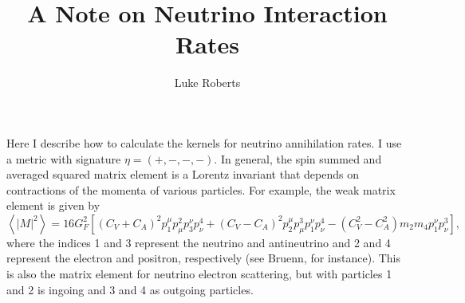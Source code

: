 \documentclass[12pt,letter]{article}
\title{A Note on Neutrino Interaction Rates}
\author{Luke Roberts}
\date{} %
\begin{document}
\maketitle

Here I describe how to calculate the kernels for neutrino annihilation rates.  I use a metric with signature $\eta = (+,-,-,-)$.  In general, the spin summed and averaged squared matrix element is a Lorentz invariant that depends on contractions of the momenta of various particles.  For example, the weak matrix element is given by  
\begin{equation*}
\left\langle \left| M \right|^2 \right \rangle = 16 G_F^2 \left [ 
(C_V + C_A)^2 p^\mu_1 p_\mu^2 p^\nu_3 p_\nu^4
+(C_V - C_A)^2 p^\mu_2 p_\mu^3 p^\nu_1 p_\nu^4
-(C_V^2 - C_A^2) m_2 m_4 p^\nu_1 p_\nu^3
\right],
\end{equation*}
where the indices 1 and 3 represent the neutrino and antineutrino and 2 and 4 represent the electron and positron, respectively (see Bruenn, for instance).  This is also the matrix element for neutrino electron scattering, but with particles 1 and 2 is ingoing and 3 and 4 as outgoing particles. 
 
\end{document}

